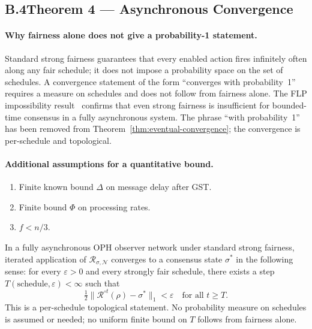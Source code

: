 \subsection*{B.4\quad Theorem 4 --- Asynchronous Convergence}

\paragraph{Why fairness alone does not give a probability-1 statement.}
Standard strong fairness guarantees that every enabled action fires
infinitely often along any fair schedule; it does not impose a probability
space on the set of schedules.
A convergence statement of the form ``converges with probability~1''
requires a measure on schedules and does not follow from fairness alone.
The \textrm{FLP} impossibility result~\cite{FLP85} confirms that even
strong fairness is insufficient for bounded-time consensus in a fully
asynchronous system.
The phrase ``with probability~1'' has been removed from
Theorem~\ref{thm:eventual-convergence}; the convergence is per-schedule
and topological.

\paragraph{Additional assumptions for a quantitative bound.}
\begin{enumerate}[(B1)]
  \item Finite known bound $\Delta$ on message delay after \textrm{GST}.
  \item Finite bound $\Phi$ on processing rates.
  \item $f < n/3$.
\end{enumerate}

\begin{theorem}
\label{thm:eventual-convergence}
In a fully asynchronous \textrm{OPH} observer network under standard
strong fairness, iterated application of $\mathcal{R}_{\sigma,\mathcal{N}}$
converges to a consensus state $\sigma^*$ in the following sense:
for every $\varepsilon>0$ and every strongly fair schedule,
there exists a step $T(\text{schedule},\varepsilon)<\infty$ such that
\[
  \tfrac12\bigl\|\mathcal{R}^{\circ t}(\rho)-\sigma^*\bigr\|_1
  <\varepsilon
  \quad\text{for all }t\geq T.
\]
This is a per-schedule topological statement.
No probability measure on schedules is assumed or needed;
no uniform finite bound on $T$ follows from fairness alone.
\end{theorem}

